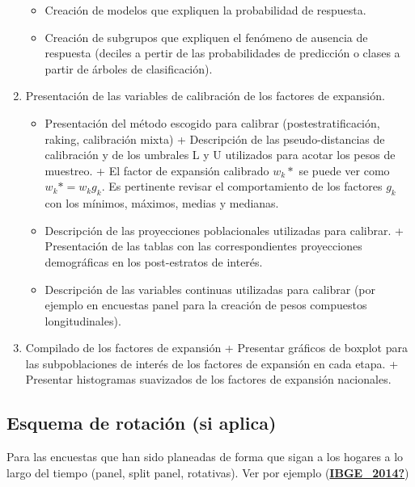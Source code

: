\documentclass[
  12pt,
  spanish,
]{book}
\providecommand{\tightlist}{%
  \setlength{\itemsep}{0pt}\setlength{\parskip}{0pt}}
\begin{document}
\begin{enumerate}
  \begin{itemize}
  \tightlist
  \item
    Creación de modelos que expliquen la probabilidad de respuesta.
  \item
    Creación de subgrupos que expliquen el fenómeno de ausencia de respuesta (deciles a pertir de las probabilidades de predicción o clases a partir de árboles de clasificación).
  \end{itemize}
\item
  Presentación de las variables de calibración de los factores de expansión.

  \begin{itemize}
  \tightlist
  \item
    Presentación del método escogido para calibrar (postestratificación, raking, calibración mixta)
    + Descripción de las pseudo-distancias de calibración y de los umbrales L y U utilizados para acotar los pesos de muestreo.
    + El factor de expansión calibrado \(w_k*\) se puede ver como \(w_k* = w_k g_k\). Es pertinente revisar el comportamiento de los factores \(g_k\) con los mínimos, máximos, medias y medianas.
  \item
    Descripción de las proyecciones poblacionales utilizadas para calibrar.
    + Presentación de las tablas con las correspondientes proyecciones demográficas en los post-estratos de interés.
  \item
    Descripción de las variables continuas utilizadas para calibrar (por ejemplo en encuestas panel para la creación de pesos compuestos longitudinales).
  \end{itemize}
\item
  Compilado de los factores de expansión
  + Presentar gráficos de boxplot para las subpoblaciones de interés de los factores de expansión en cada etapa.
  + Presentar histogramas suavizados de los factores de expansión nacionales.
\end{enumerate}

\hypertarget{esquema-de-rotaciuxf3n-si-aplica}{%
\subsection*{Esquema de rotación (si aplica)}\label{esquema-de-rotaciuxf3n-si-aplica}}

Para las encuestas que han sido planeadas de forma que sigan a los hogares a lo largo del tiempo (panel, split panel, rotativas). Ver por ejemplo (\protect\hyperlink{ref-IBGE_2014}{\textbf{IBGE\_2014?}})
\end{document}
